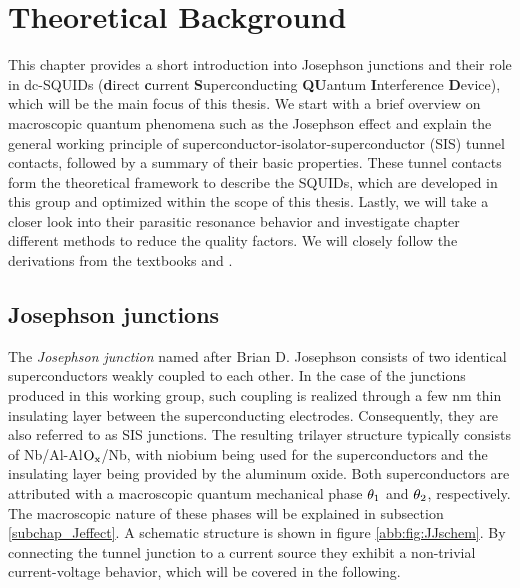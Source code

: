 \chapter{Theoretical Background}

This chapter provides a short introduction into Josephson junctions and their role in dc-SQUIDs (\textbf{d}irect \textbf{c}urrent \textbf{S}uperconducting \textbf{QU}antum \textbf{I}nterference \textbf{D}evice), which will be the main focus of this thesis. We start with a brief overview on macroscopic quantum phenomena such as the Josephson effect and explain the general working principle of superconductor-isolator-superconductor (SIS) tunnel contacts, followed by a summary of their basic properties. These tunnel contacts form the theoretical framework to describe the SQUIDs, which are developed in this group and optimized within the scope of this thesis. Lastly, we will take a closer look into their parasitic resonance behavior and investigate chapter different methods to reduce the quality factors. We will closely follow the derivations from the textbooks \cite{Clarke2004} and \cite{Gross2016}.

\section{Josephson junctions}


The \textit{Josephson junction} named after Brian D. Josephson consists of two identical superconductors weakly coupled to each other. In the case of the junctions produced in this working group, such coupling is realized through a few nm thin insulating layer between the superconducting electrodes. Consequently, they are also referred to as SIS junctions. The resulting trilayer structure typically consists of Nb/Al-Al$\rm O_x$/Nb, with niobium being used for the superconductors and the insulating layer being provided by the aluminum oxide. Both superconductors are attributed with a macroscopic quantum mechanical phase $\theta_{\rm 1}$ and $\theta_{\rm 2}$, respectively. The macroscopic nature of these phases will be explained in subsection \ref{subchap_Jeffect}. A schematic structure is shown in figure \ref{abb:fig:JJschem}. %
By connecting the tunnel junction to a current source they exhibit a non-trivial current-voltage behavior, which will be covered in the following. 

        
